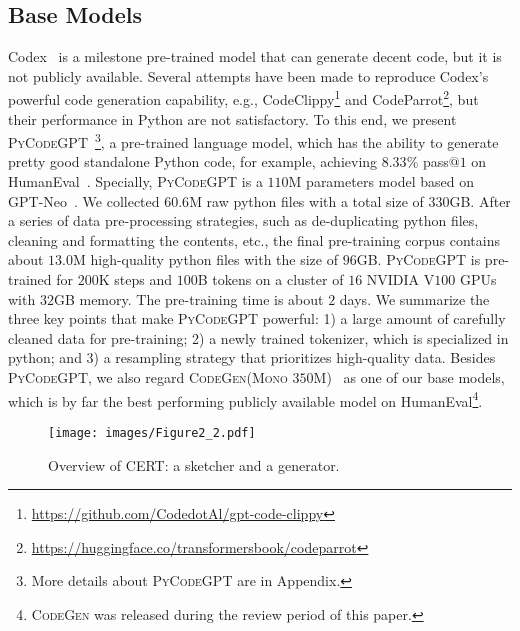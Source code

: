 \documentclass{article}
\newcommand{\cert}{\textsc{CERT}\xspace}
\newcommand{\codepy}{\textsc{PyCodeGPT}\xspace}
\newcommand{\codegen}{\textsc{CodeGen}\xspace}
\begin{document}
\subsection{Base Models} \label{basemodel}
Codex~\cite{chen2021evaluating} is a milestone pre-trained model that can generate decent code, but it is not publicly available. Several attempts have been made to reproduce Codex's powerful code generation capability, e.g.,  CodeClippy\footnote{\url{https://github.com/CodedotAl/gpt-code-clippy}} and CodeParrot\footnote{\url{https://huggingface.co/transformersbook/codeparrot}}, but their performance in Python are not satisfactory. To this end, we present \codepy~\footnote{More details about \codepy are in Appendix.}, a pre-trained language model, which has the ability to generate pretty good standalone Python code, for example, achieving $8.33\%$ pass$@1$ on HumanEval~\cite{chen2021evaluating}. 
Specially, \codepy is a $110$M parameters model based on GPT-Neo~\cite{gpt-neo}. We collected $60.6$M raw python files with a total size of $330$GB. After a series of data pre-processing strategies, such as de-duplicating python files, cleaning and formatting the contents, etc., the final pre-training corpus contains about $13.0$M high-quality python files with the size of $96$GB. 
\codepy is pre-trained for $200$K steps and $100$B tokens on a cluster of $16$ NVIDIA V$100$ GPUs with $32$GB memory. The pre-training time is about $2$ days.
We summarize the three key points that make \codepy powerful: 1) a large amount of carefully cleaned data for pre-training; 2) a newly trained tokenizer, which is specialized in python; and 3) a resampling strategy that prioritizes high-quality data.
Besides \codepy, we also regard \codegen (\textsc{Mono} $350$M)~\cite{nijkamp2022conversational} as one of our base models, which is by far the best performing publicly available model on HumanEval\footnote{\codegen was released during the review period of this paper.}.

\begin{figure}[t]
    \small
    \centering
    \texttt{[image: images/Figure2\_2.pdf]}
\caption{Overview of \cert: a sketcher and a generator.}
    \label{fig:figure2}
\end{figure}
\end{document}
